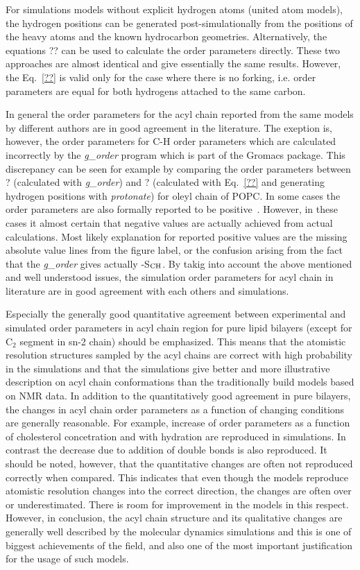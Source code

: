 \documentclass[aps,prl,superscriptaddress,twocolumn]{revtex4}
\begin{document}
For simulations models without explicit hydrogen atoms 
(united atom models), the hydrogen positions can be generated post-simulationally from 
the positions of the heavy atoms and the known hydrocarbon geometries.
Alternatively, the equations 
??
can be used to calculate the order parameters directly.
These two approaches are almost identical and give essentially the 
same results. However, the Eq.~\ref{??} is valid only for the case where there is no
forking, i.e. order parameters are equal for both hydrogens attached to the 
same carbon.

In general the order parameters for the acyl chain reported from the same
models by different authors are in good agreement in the literature.
The exeption is, however, the order parameters for C-H order parameters
which are calculated incorrectly by the {\it g\_order} program which
is part of the Gromacs package. This discrepancy can be seen
for example by comparing the order parameters between ? (calculated with {\it g\_order}) and ?
(calculated with Eq.~\ref{??} and generating hydrogen positions with {\it protonate}) for
oleyl chain of POPC. In some cases the order parameters are also formally reported 
to be positive~\cite{??}. However, in these cases it almost certain that negative values are
actually achieved from actual calculations. Most likely explanation for reported positive 
values are the missing absolute value lines from the figure label, or the confusion arising
from the fact that the {\it g\_order} gives actually -S$_{{\rm CH}}$.
By takig into account the above mentioned and well understood issues, 
the simulation order parameters for acyl chain in literature are in good
agreement with each others and simulations.

Especially the generally good quantitative agreement between experimental and simulated
order parameters in acyl chain region for pure lipid bilayers (except for C$_2$ segment in sn-2 chain) should be emphasized.
This means that the atomistic resolution structures sampled by the acyl chains are correct
with high probability in the simulations and that the simulations give better and more illustrative
description on acyl chain conformations than the traditionally build models based on NMR data. 
In addition to the quantitatively good agreement in pure bilayers, the changes in 
acyl chain order parameters as a function of changing conditions are generally reasonable.
For example, increase of order parameters as a function of cholesterol concetration and with 
hydration are reproduced in simulations. In contrast the decrease due to addition of
double bonds is also reproduced. It should be noted, however, that the quantitative changes
are often not reproduced correctly when compared. This indicates that even though
the models reproduce atomistic resolution changes into the correct direction, 
the changes are often over or underestimated. There is room for improvement
in the models in this respect. However, in conclusion, the acyl chain 
structure and its qualitative changes are generally well described by the
molecular dynamics simulations and this is one of biggest achievements of the
field, and also one of the most important justification for the usage of such models.
\end{document}
